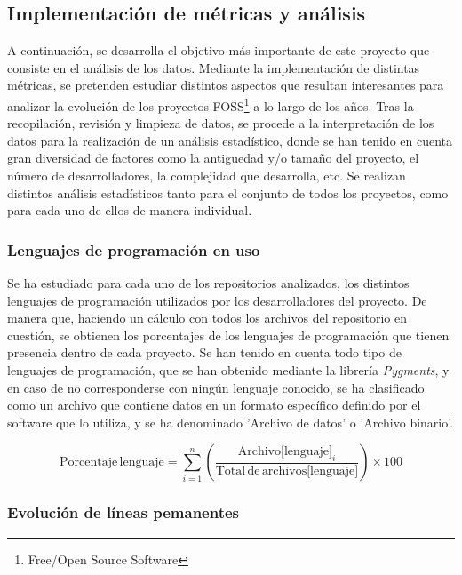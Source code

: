 \documentclass[a4paper, 12pt]{book}
\begin{document}
\subsection{Implementación de métricas y análisis}
\label{subsec:metricas}

A continuación, se desarrolla el objetivo más importante de este proyecto que consiste en el análisis de los datos. Mediante la implementación de distintas métricas, se pretenden estudiar distintos aspectos que resultan interesantes para analizar la evolución de los proyectos
FOSS\footnote{Free/Open Source Software} a lo largo de los años.
Tras la recopilación, revisión y limpieza de datos, se procede a la interpretación de los datos para la realización de un análisis estadístico, donde se han tenido en cuenta gran diversidad de factores como la antiguedad y/o tamaño del proyecto, el número de desarrolladores, la
complejidad que desarrolla, etc. Se realizan distintos análisis estadísticos tanto para el conjunto de todos los proyectos, como para cada uno de ellos de manera individual.

\subsubsection{Lenguajes de programación en uso}
\label{subsubsec:lenguajes}

Se ha estudiado para cada uno de los repositorios analizados, los distintos lenguajes de programación utilizados por los desarrolladores del proyecto. De manera que, haciendo un cálculo con todos los archivos del repositorio en cuestión, se obtienen los porcentajes de los lenguajes
de programación que tienen presencia dentro de cada proyecto. Se han tenido en cuenta todo tipo de lenguajes de programación, que se han obtenido mediante la librería \textit{Pygments},  y en caso de no corresponderse
con ningún lenguaje conocido, se ha clasificado como un archivo que contiene datos en un formato específico definido por el software que lo utiliza, y se ha denominado 'Archivo de datos' o 'Archivo binario'.

\[\text{Porcentaje} \, \text{lenguaje} = \sum_{i=1}^{n} \left( \frac{\text{Archivo[lenguaje]}_i}{\text{Total} \, \text{de} \, \text{archivos[lenguaje]}} \right) \times 100\]

\subsubsection{Evolución de líneas pemanentes}
\label{subsubsec:lineas-vivas}
\end{document}
